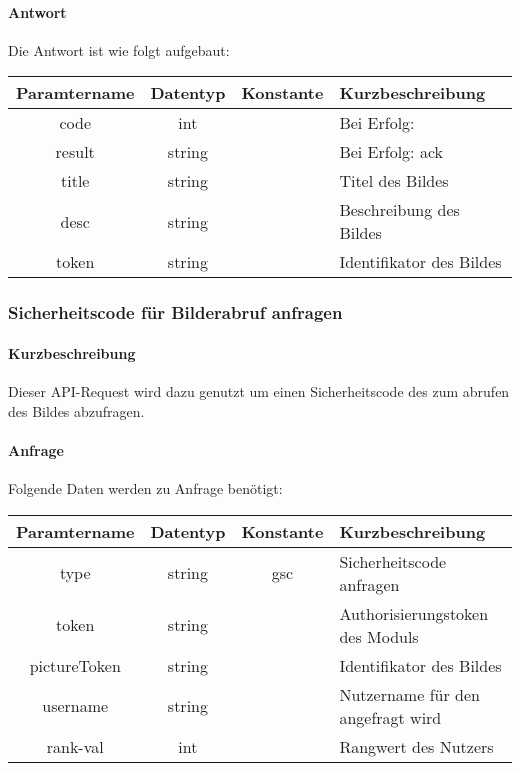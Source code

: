 \paragraph{Antwort}Die Antwort ist wie folgt aufgebaut:
\begin{table}[H]
	\begin{tabular}{|c|c|c|p{6.5cm}|}
		\hline
		\textbf{Paramtername} & \textbf{Datentyp} & \textbf{Konstante} & \textbf{Kurzbeschreibung}            \\ \hline                
		code                & int              &                 & Bei Erfolg: {\glqq 0\grqq} \\ \hline
		result              & string           &                 & Bei Erfolg: {\glqq ack\grqq} \\ \hline
		title               & string           &                 & Titel des Bildes \\ \hline
		desc                & string           &                 & Beschreibung des Bildes \\ \hline
		token               & string           &                 & Identifikator des Bildes \\ \hline
	\end{tabular}
\end{table}
\subsubsection{Sicherheitscode für Bilderabruf anfragen}
\paragraph{Kurzbeschreibung}Dieser API-Request wird dazu genutzt um einen Sicherheitscode des zum abrufen des Bildes abzufragen.
\paragraph{Anfrage}Folgende Daten werden zu Anfrage benötigt:
\begin{table}[H]
	\begin{tabular}{|c|c|c|p{6.5cm}|}
		\hline
		\textbf{Paramtername} & \textbf{Datentyp} & \textbf{Konstante} & \textbf{Kurzbeschreibung}                                                                                               \\ \hline
		type                & string            & gsc                & Sicherheitscode anfragen \\ \hline
		token               & string            &                    & Authorisierungstoken des Moduls \\ \hline
		pictureToken        & string            &                    & Identifikator des Bildes \\ \hline
		username            & string            &                    & Nutzername für den angefragt wird \\ \hline
		rank-val            & int               &                    & Rangwert des Nutzers \\ \hline
	\end{tabular}
\end{table}
